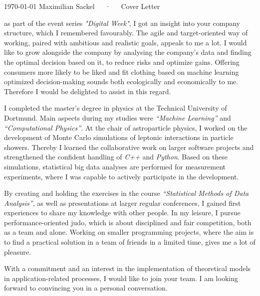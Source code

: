 \documentclass[11pt, a4paper]{Awesome-CV/awesome-cv}
\begin{document}
\makecvheader[R]

\makecvfooter
{\today}
{Maximilian Sackel~~~·~~~Cover Letter}
{}

\makelettertitle

\begin{cvletter}
    as part of the event series \textit{"Digital Week"}, I got an insight into your company structure,
    which I remembered favourably.
    The agile and target-oriented way of working,
    paired with ambitious and realistic goals,
    appeals to me a lot.
    I would like to grow alongside the company by analysing the company's data
    and finding the optimal decision based on it, to reduce risks and optimize gains.
    Offering consumers more likely to be liked and fit clothing based on machine learning optimized decision-making sounds both ecologically and economically to me.
    Therefore I would be delighted to assist in this regard.

    I completed the master's degree in physics at the Technical University of Dortmund.
    Main aspects during my studies were \textit{``Machine Learning''} and \textit{``Computational Physics''}.
    At the chair of astroparticle physics, I worked on the development of Monte Carlo simulations of leptonic interactions in particle showers.
    Thereby I learned the collaborative work on larger software projects and strengthened the confident handling of \textit{C++} and \textit{Python}.
    Based on these simulations, statistical big data analyses are performed for measurement experiments,
    where I was capable to actively participate in the development.

    By creating and holding the exercises in the course
    \textit{``Statistical Methods of Data Analysis''}, as well as
    presentations at larger regular conferences,
    I gained first experiences to share my knowledge with other people.
    In my leisure, I pursue performance-oriented judo, which is about disciplined and fair competition, both as a team and alone.
    Working on smaller programming projects, where the aim is to find a
    practical solution in a team of friends in a limited time, gives me a lot of
    pleasure.

    With a commitment and an interest in the implementation of
    theoretical models in application-related processes, I would like to join
    your team.
    I am looking forward to convincing you in a personal conversation.

\end{cvletter}


\makeletterclosing
\end{document}
